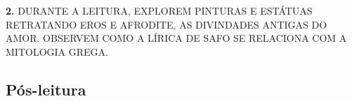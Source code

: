 \documentclass[12pt]{extarticle}
\begin{document}

\textbf{2.} DURANTE A LEITURA, EXPLOREM PINTURAS E ESTÁTUAS RETRATANDO
EROS E AFRODITE, AS DIVINDADES ANTIGAS DO AMOR. OBSERVEM COMO A LÍRICA
DE SAFO SE RELACIONA COM A MITOLOGIA GREGA.



\subsection{Pós-leitura}








\end{document}
